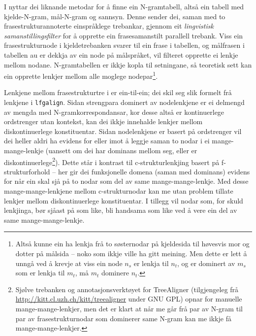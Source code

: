 \documentclass[12pt,a4paper,oneside,draft]{report}
\begin{document}
 I \citet{samuelsson2007apa} nyttar dei liknande metodar for å finne
 ein N-gramtabell, altså ein tabell med kjelde-N-gram, mål-N-gram og
 sannsyn. Denne sender dei, saman med to frasestrukturannoterte
 einspråklege trebankar, gjennom eit \emph{lingvistisk  samanstillingsfilter} for å opprette ein frasesamanstilt parallell
 trebank. Viss ein frasestrukturnode i kjeldetrebanken svarer til ein
 frase i tabellen, og målfrasen i tabellen au er dekkja av ein node på
 målspråket, vil filteret opprette ei lenkje mellom nodane.
 N-gramtabellen er ikkje kopla til setningane, så teoretisk sett kan
 ein opprette lenkjer mellom alle moglege nodepar\footnote{Altså kunne ein ha lenkja frå to søsternodar på kjeldesida til
        høvesvis mor og dotter på målsida -- noko som ikkje ville ha
        gitt meining. Men dette er lett å unngå ved å krevje at viss
        ein node $n_s$ er lenkja til $n_t$, og er dominert av $m_s$
        som er lenkja til $m_t$, må $m_t$ dominere $n_t$. }.

 Lenkjene mellom frasestrukturtre i \citet{samuelsson2007apa} er
 ein-til-ein; dei skil seg slik formelt frå lenkjene i
 \texttt{lfgalign}. Sidan strengpara dominert av nodelenkjene er ei delmengd
 av mengda med N-gramkorrespondansar, kor desse altså er kontinuerlege
 ordstrenger utan kontekst, kan dei ikkje innehalde lenkjer mellom
 diskontinuerlege konstituentar. Sidan nodelenkjene er basert på
 ordstrenger vil dei heller aldri ha evidens for eller imot å leggje
 saman to nodar i ei mange-mange-lenkje (uansett om dei har dominans
 mellom seg, eller er diskontinuerlege\footnote{Sjølve trebanken \citep{samuelsson2006pap} og
        annotasjonsverktøyet for TreeAligner (tilgjengeleg frå
        \href{http://kitt.cl.uzh.ch/kitt/treealigner}{http://kitt.cl.uzh.ch/kitt/treealigner} under GNU GPL) opnar
        for manuelle mange-mange-lenkjer, men det er klart at når me
        går frå par av N-gram til par av frasestrukturnodar som
        dominerer same N-gram kan me ikkje få mange-mange-lenkjer. }). Dette står i kontrast
 til c-strukturlenkjing basert på f-strukturforhold -- her gir dei
 funksjonelle domena (saman med dominans) evidens for når ein skal sjå
 på to nodar som del av same mange-mange-lenkje.  Med desse
 mange-mange-lenkjene mellom c-strukturnodar kan me utan problem
 tillate lenkjer mellom diskontinuerlege konstituentar. I tillegg vil
 nodar som, for skuld lenkjinga, bør sjåast på som like, bli handsama
 som like ved å vere ein del av same mange-mange-lenkje.
 
\end{document}

